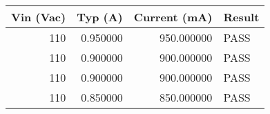 

\begin{tabular}{rrrl}
\toprule
Vin (Vac) & Typ (A) & Current (mA) & Result \\
\midrule
110 & 0.950000 & 950.000000 & PASS \\
110 & 0.900000 & 900.000000 & PASS \\
110 & 0.900000 & 900.000000 & PASS \\
110 & 0.850000 & 850.000000 & PASS \\
\bottomrule
\end{tabular}
